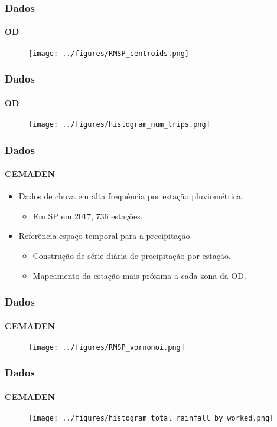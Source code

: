 \begin{frame}[plain]
    \frametitle{Dados}
    \framesubtitle{OD}
    \begin{figure}[H]
        \centering
        \texttt{[image: ../figures/RMSP\_centroids.png]}
        \label{fig:od_centroids}
    \end{figure} 
\end{frame}
\begin{frame}[plain]
    \frametitle{Dados}
    \framesubtitle{OD}
    \begin{figure}[H]
        \centering
        \texttt{[image: ../figures/histogram\_num\_trips.png]}
        \label{fig:hist_num_trips}
    \end{figure} 
\end{frame}

\begin{frame}
    \frametitle{Dados}
    \framesubtitle{CEMADEN}
    \begin{itemize}
    \item Dados de chuva em alta frequência por estação pluviométrica.
    \begin{itemize}
        \item Em SP em 2017, 736 estações.
    \end{itemize}
    \item Referência espaço-temporal para a precipitação.\begin{itemize}
        \item Construção de série diária de precipitação por estação.
        \item Mapeamento da estação mais próxima a cada zona da OD.
    \end{itemize}
    \end{itemize}
\end{frame}

\begin{frame}[plain]
    \frametitle{Dados}
    \framesubtitle{CEMADEN}
    \begin{figure}[H]
        \centering
        \texttt{[image: ../figures/RMSP\_vornonoi.png]}
        \label{fig:cemaden_voronoi}
    \end{figure} 
\end{frame}
\begin{frame}[plain]
    \frametitle{Dados}
    \framesubtitle{CEMADEN}
    \begin{figure}[H]
        \centering
        \texttt{[image: ../figures/histogram\_total\_rainfall\_by\_worked.png]}
        \label{fig:cemaden_voronoi}
    \end{figure} 
\end{frame}


